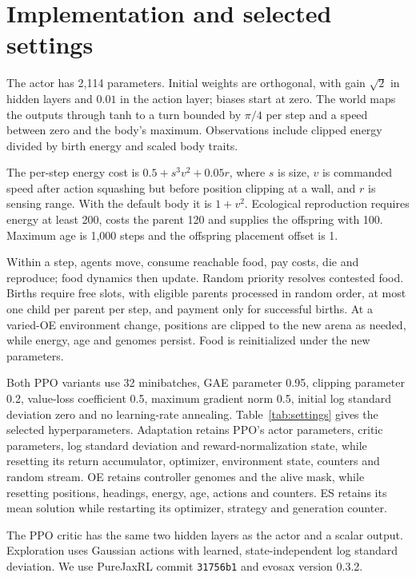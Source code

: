 \section{Implementation and selected settings}
\label{app:implementation}
The actor has 2,114 parameters. Initial weights are orthogonal, with gain $\sqrt{2}$ in hidden layers and $0.01$ in the action layer; biases start at zero. The world maps the outputs through tanh to a turn bounded by $\pi/4$ per step and a speed between zero and the body's maximum. Observations include clipped energy divided by birth energy and scaled body traits.

The per-step energy cost is $0.5+s^3v^2+0.05r$, where $s$ is size, $v$ is commanded speed after action squashing but before position clipping at a wall, and $r$ is sensing range. With the default body it is $1+v^2$. Ecological reproduction requires energy at least 200, costs the parent 120 and supplies the offspring with 100. Maximum age is 1,000 steps and the offspring placement offset is 1.

Within a step, agents move, consume reachable food, pay costs, die and reproduce; food dynamics then update. Random priority resolves contested food. Births require free slots, with eligible parents processed in random order, at most one child per parent per step, and payment only for successful births. At a varied-OE environment change, positions are clipped to the new arena as needed, while energy, age and genomes persist. Food is reinitialized under the new parameters.

Both PPO variants use 32 minibatches, GAE parameter 0.95, clipping parameter 0.2, value-loss coefficient 0.5, maximum gradient norm 0.5, initial log standard deviation zero and no learning-rate annealing. Table~\ref{tab:settings} gives the selected hyperparameters. Adaptation retains PPO's actor parameters, critic parameters, log standard deviation and reward-normalization state, while resetting its return accumulator, optimizer, environment state, counters and random stream. OE retains controller genomes and the alive mask, while resetting positions, headings, energy, age, actions and counters. ES retains its mean solution while restarting its optimizer, strategy and generation counter.

The PPO critic has the same two hidden layers as the actor and a scalar output. Exploration uses Gaussian actions with learned, state-independent log standard deviation. We use PureJaxRL commit \texttt{31756b1} and evosax version 0.3.2.

